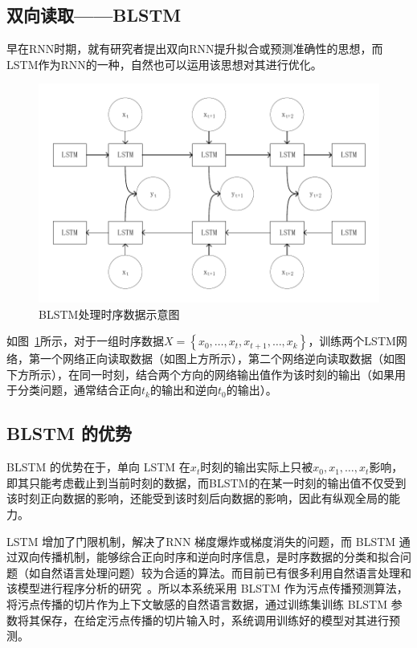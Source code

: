 \subsection{双向读取——BLSTM}
早在RNN时期，就有研究者提出双向RNN提升拟合或预测准确性的思想，而LSTM作为RNN的一种，自然也可以运用该思想对其进行优化。

\begin{figure}[htb]
	\centering
	\includegraphics[width=0.8\linewidth]{FIGs/chapter2/blstm.pdf}
	\caption{BLSTM处理时序数据示意图}\label{blstm}
\end{figure}
如图~\ref{blstm}所示，对于一组时序数据$X=\left\{ x_0,\dots,x_t,x_{t+1},\dots,x_{k} \right\}$，训练两个LSTM网络，第一个网络正向读取数据（如图上方所示），第二个网络逆向读取数据（如图下方所示），在同一时刻，结合两个方向的网络输出值作为该时刻的输出（如果用于分类问题，通常结合正向$t_k$的输出和逆向$t_0$的输出）。


\subsection{BLSTM 的优势}

BLSTM 的优势在于，单向 LSTM 在$x_t$时刻的输出实际上只被$x_0, x_1, \dots, x_t$影响，即其只能考虑截止到当前时刻的数据，而BLSTM的在某一时刻的输出值不仅受到该时刻正向数据的影响，还能受到该时刻后向数据的影响，因此有纵观全局的能力。

LSTM 增加了门限机制，解决了RNN 梯度爆炸或梯度消失的问题，而 BLSTM 通过双向传播机制，能够综合正向时序和逆向时序信息，是时序数据的分类和拟合问题（如自然语言处理问题）较为合适的算法。而目前已有很多利用自然语言处理和该模型进行程序分析的研究~\cite{naturalSoftware,lstm:recognize,lstm:repo,vuldeepecker,Koc2017,Koc2019}。所以本系统采用 BLSTM 作为污点传播预测算法，将污点传播的切片作为上下文敏感的自然语言数据，通过训练集训练 BLSTM 参数将其保存，在给定污点传播的切片输入时，系统调用训练好的模型对其进行预测。

